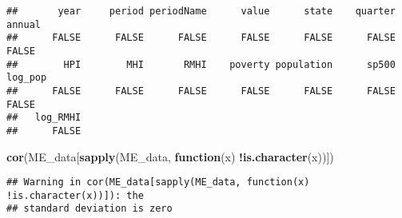 \documentclass[
]{article}
\newenvironment{Shaded}{\begin{snugshade}}{\end{snugshade}}
\newcommand{\ControlFlowTok}[1]{\textcolor[rgb]{0.13,0.29,0.53}{\textbf{#1}}}
\newcommand{\KeywordTok}[1]{\textcolor[rgb]{0.13,0.29,0.53}{\textbf{#1}}}
\newcommand{\NormalTok}[1]{#1}
\newcommand{\OperatorTok}[1]{\textcolor[rgb]{0.81,0.36,0.00}{\textbf{#1}}}
\begin{document}
\begin{verbatim}
##       year     period periodName      value      state    quarter     annual 
##      FALSE      FALSE      FALSE      FALSE      FALSE      FALSE      FALSE 
##        HPI        MHI       RMHI    poverty population      sp500    log_pop 
##      FALSE      FALSE      FALSE      FALSE      FALSE      FALSE      FALSE 
##   log_RMHI 
##      FALSE
\end{verbatim}

\begin{Shaded}
\begin{Highlighting}[]
\KeywordTok{cor}\NormalTok{(ME_data[}\KeywordTok{sapply}\NormalTok{(ME_data, }\ControlFlowTok{function}\NormalTok{(x) }\OperatorTok{!}\KeywordTok{is.character}\NormalTok{(x))])}
\end{Highlighting}
\end{Shaded}

\begin{verbatim}
## Warning in cor(ME_data[sapply(ME_data, function(x) !is.character(x))]): the
## standard deviation is zero
\end{verbatim}
\end{document}
